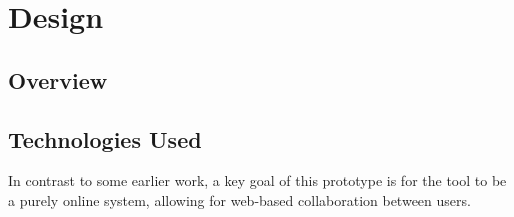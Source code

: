 %
\chapter{Design}
\label{sec:design}


\section{Overview}
\label{sec:design:overview}



\section{Technologies Used}
\label{sec:overview:technologies-used}

In contrast to some earlier work, a key goal of this prototype is for the tool to be a purely online system, allowing for web-based collaboration between users.  

%
%
%
%
%
%
%
%
%
%
%
%
%
